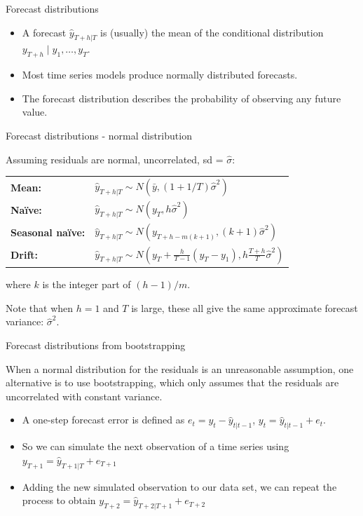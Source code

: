 \documentclass[
  14pt,
  ignorenonframetext,
  aspectratio=169,
]{beamer}
\providecommand{\tightlist}{%
  \setlength{\itemsep}{0pt}\setlength{\parskip}{0pt}}\usepackage{longtable,booktabs,array}
\begin{document}
\begin{frame}{Forecast distributions}
\protect\hypertarget{forecast-distributions}{}
\begin{itemize}
\tightlist
\item
  A forecast \(\hat{y}_{T+h|T}\) is (usually) the mean of the
  conditional distribution \(y_{T+h} \mid y_1, \dots, y_{T}\).
\item
  Most time series models produce normally distributed forecasts.
\item
  The forecast distribution describes the probability of observing any
  future value.
\end{itemize}
\end{frame}

\begin{frame}{Forecast distributions - normal distribution}
\protect\hypertarget{forecast-distributions---normal-distribution}{}
\fontsize{14}{18}\sf

Assuming residuals are normal, uncorrelated, sd = \(\hat\sigma\):

\begin{block}{}
\begin{tabular}{ll}
\bf Mean: & $\hat{y}_{T+h|T} \sim N(\bar{y}, (1 + 1/T)\hat{\sigma}^2)$\\[0.2cm]
\bf Naïve: & $\hat{y}_{T+h|T} \sim N(y_T, h\hat{\sigma}^2)$\\[0.2cm]
\bf Seasonal naïve: & $\hat{y}_{T+h|T} \sim N(y_{T+h-m(k+1)}, (k+1)\hat{\sigma}^2)$\\[0.2cm]
\bf Drift: & $\hat{y}_{T+h|T} \sim N(y_T + \frac{h}{T-1}(y_T - y_1),h\frac{T+h}{T}\hat{\sigma}^2)$
\end{tabular}
\end{block}

where \(k\) is the integer part of \((h-1)/m\).

Note that when \(h=1\) and \(T\) is large, these all give the same
approximate forecast variance: \(\hat{\sigma}^2\).
\end{frame}

\begin{frame}{Forecast distributions from bootstrapping}
\protect\hypertarget{forecast-distributions-from-bootstrapping}{}
\fontsize{10}{13}\sf

When a normal distribution for the residuals is an unreasonable
assumption, one alternative is to use bootstrapping, which only assumes
that the residuals are uncorrelated with constant variance.

\begin{itemize}
\item
  A one-step forecast error is defined as
  \(e_t = y_t - \hat{y}_{t|t-1}\), \(y_t = \hat{y}_{t|t-1} + e_t.\)
\item
  So we can simulate the next observation of a time series using
  \(y_{T+1} = \hat{y}_{T+1|T} + e_{T+1}\)
\item
  Adding the new simulated observation to our data set, we can repeat
  the process to obtain \(y_{T+2} = \hat{y}_{T+2|T+1} + e_{T+2}\)
\end{itemize}
\end{frame}
\end{document}
